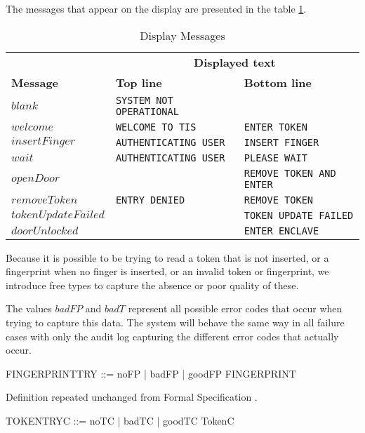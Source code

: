 The messages that appear on the display are presented in the table \ref{tab:display}.

\begin{table}[h]
\begin{tabular}{|l|l|l|}
                & \multicolumn{2}{c|}{\bf Displayed text} \\ \cline{2-3}
{\bf Message}   & {\bf Top line}                & {\bf Bottom line}     \\
\hline
$blank$         & {\tt SYSTEM NOT OPERATIONAL}  &\\
$welcome$       & {\tt WELCOME TO TIS}          & {\tt ENTER TOKEN}  \\
$insertFinger$  & {\tt AUTHENTICATING USER}     & {\tt INSERT FINGER} \\ 
$wait$          & {\tt AUTHENTICATING USER}     & {\tt PLEASE WAIT} \\
$openDoor$      & {\tt }                        & {\tt REMOVE TOKEN AND ENTER} \\
$removeToken$   & {\tt ENTRY DENIED}            & {\tt REMOVE TOKEN} \\
$tokenUpdateFailed$ &                   & {\tt TOKEN UPDATE FAILED } \\
$doorUnlocked$  &                       & {\tt ENTER ENCLAVE} \\
\hline
\end{tabular}
\caption{Display Messages}
\label{tab:display}
\end{table}

Because it is possible to be trying to read a token that is not inserted,
or a fingerprint when no finger is inserted,
or an invalid token or fingerprint, 
we introduce free types to capture the absence or poor quality of these.

The values $badFP$ and $badT$ represent all possible error codes that
occur when trying to capture this data. The system will behave the
same way in all failure cases with only the audit log capturing the
different error codes that actually occur.
\begin{zed}
	FINGERPRINTTRY ::= noFP | badFP | goodFP \ldata FINGERPRINT \rdata
\end{zed}
\begin{Zcomment}
\item Definition repeated unchanged from Formal Specification \cite{FS}.
\end{Zcomment}
\begin{zed}
	TOKENTRYC ::= noTC | badTC | goodTC \ldata TokenC \rdata
\end{zed}

